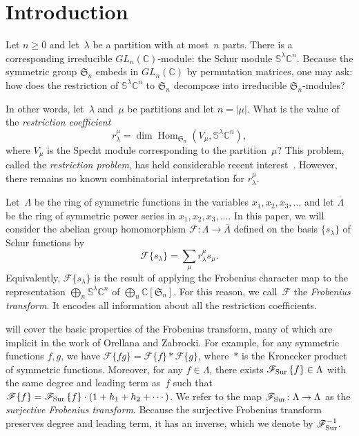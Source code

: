 \documentclass[11pt]{article}
\theoremstyle{definition}
\numberwithin{equation}{section}
\newcommand{\K}{\mathbb{C}}
\newcommand{\Fa}{\mathscr{F}}
\newcommand{\Sur}{\mathchoice{\operatorname{Sur}}{\operatorname{Sur}}{\mathrm{Sur}}{\mathrm{Sur}}}
\newcommand{\F}[1]{\mathscr{F}\{#1\}}
\newcommand{\FSur}[1]{\mathscr{F}_{\Sur}\left\{#1\right\}}
\newcommand{\Sym}{\mathfrak{S}}
\begin{document}
\section{Introduction}
Let $n \geq 0$ and let~$\lambda$ be a partition with at most~$n$ parts. There is a corresponding irreducible $GL_n(\K)$-module: the Schur module $\mathbb{S}^\lambda \K^n$. Because the symmetric group $\Sym_n$ embeds in $GL_n(\K)$ by permutation matrices, one may ask: how does the restriction of $\mathbb{S}^\lambda \K^n$ to $\Sym_n$ decompose into irreducible $\Sym_n$-modules?

In other words, let~$\lambda$ and~$\mu$ be partitions and let $n = |\mu|$. What is the value of the \textit{restriction coefficient} \[r_{\lambda}^\mu = \dim \operatorname{Hom}_{\Sym_n}(V_\mu, \mathbb{S}^\lambda \K^n),\] where $V_\mu$ is the Specht module corresponding to the partition~$\mu$? This problem, called the \emph{restriction problem}, has held considerable recent interest~\cite{MR4055931, MR4356269, MR4311085, MR4295089, MR4127906}. However, there remains no known combinatorial interpretation for $r_\lambda^\mu$.

Let~$\Lambda$ be the ring of symmetric functions in the variables $x_1, x_2, x_3, \ldots$ and let $\overline{\Lambda}$ be the ring of symmetric power series in $x_1, x_2, x_3, \ldots$. In this paper, we will consider the abelian group homomorphism $\Fa \colon \Lambda \to \overline{\Lambda}$ defined on the basis $\{s_\lambda\}$ of Schur functions by \[\F{s_\lambda} = \sum_{\mu} r_{\lambda}^\mu s_\mu.\] Equivalently, $\F{s_\lambda}$ is the result of applying the Frobenius character map to the representation $\bigoplus_{n} \mathbb{S}^\lambda \K^n$ of $\bigoplus_{n} \K[\Sym_n]$. For this reason, we call~$\Fa$ the \emph{Frobenius transform}. It encodes all information about all the restriction coefficients.

 will cover the basic properties of the Frobenius transform, many of which are implicit in the work of Orellana and Zabrocki. For example, for any symmetric functions $f, g$, we have $\F{fg} = \F{f} \ast \F{g}$, where~$\ast$ is the Kronecker product of symmetric functions. Moreover, for any $f \in \Lambda$, there exists $\FSur{f} \in \Lambda$ with the same degree and leading term as~$f$ such that $\F{f} = \FSur{f} \cdot (1 + h_1 + h_2 + \cdots)$. We refer to the map $\Fa_{\Sur} \colon \Lambda \to \Lambda$ as the \emph{surjective Frobenius transform}. Because the surjective Frobenius transform preserves degree and leading term, it has an inverse, which we denote by $\Fa_{\Sur}^{-1}$.
\end{document}
